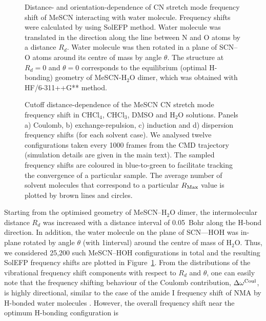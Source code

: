 \documentclass[a4paper,titlepage,twoside,fleqn,12pt]{book}
\begin{document}
\begin{refsection}
\begin{figure}[t!]
\centering
\setlength\fboxsep{0.4pt}
\setlength\fboxrule{0.5pt}
\caption{
Distance- and orientation\hyp{}dependence of CN stretch mode frequency shift of MeSCN interacting with water
molecule. Frequency shifts were calculated by using SolEFP method. Water molecule was translated in the
direction along the line between N and O atoms by a distance $R_d$. Water molecule was then rotated in a
plane of SCN--O atoms around its centre of mass by angle $\theta$. The structure at $R_d=0$ and $\theta=0$ corresponds to
the equilibrium (optimal H-bonding) geometry of MeSCN-H$_2$O dimer, which was obtained with
HF/6-311++G** method.
\label{f:mescn-scan}}
\end{figure}
%
\begin{figure}[t!]
\centering
\setlength\fboxsep{0.4pt}
\setlength\fboxrule{0.5pt}
\caption{
Cutoff distance\hyp{}dependence of the MeSCN CN stretch mode frequency shift in
CHCl$_4$, CHCl$_3$, DMSO and H$_2$O solutions. Panels a) Coulomb, b) exchange\hyp{}repulsion, c)
induction and d) dispersion frequency shifts (for each solvent case). 
We analysed twelve configurations taken every 1000
frames from the CMD trajectory (simulation details are given in the main text). The sampled
frequency shifts are coloured in blue\hyp{}to\hyp{}green to facilitate tracking the convergence of a
particular sample. The average number of solvent molecules that correspond to a particular
$R_{\rm Max}$ value is plotted by brown lines and circles.
\label{f:mescn-solefp-md-dist}}
\end{figure}
Starting from the optimised geometry of MeSCN--H$_2$O
dimer, the intermolecular distance $R_d$ was increased with
a distance interval of 0.05~Bohr along the H-bond direction. In
addition, the water molecule on the plane of SCN---HOH was
in\hyp{}plane rotated by angle $\theta$ (with 1\textdegree interval) around the centre
of mass of H$_2$O. Thus, we considered 25,200 such
MeSCN--HOH configurations in total and the resulting SolEFP
frequency shifts are plotted in Figure~\ref{f:mescn-scan}. From the distributions
of the vibrational frequency shift components with respect to
$R_d$ and $\theta$, one can easily note that the frequency shifting
behaviour of the Coulomb contribution, $\Delta\omega^{\rm Coul}$, is highly
directional, similar to the case of the amide I frequency shift of
NMA by H-bonded water molecules \citep{Blasiak.Cho.JCP.2015}. 
However, the overall
frequency shift near the optimum H-bonding configuration is

\end{refsection}
\end{document}
